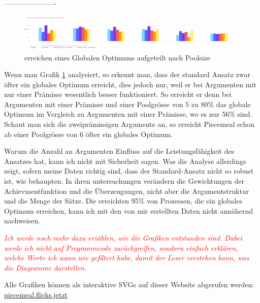 \documentclass{article}
\begin{document}
----------------------


\begin{figure}[ht]
  \centering
  \includegraphics[width=\textwidth]{erreichen eines Globalen Optimums aufgeteilt nach Poolsize}
  \caption{erreichen eines Globalen Optimums aufgeteilt nach Poolsize\label{fig:GlobOptPoolsize}}
\end{figure}

Wenn man Grafik \ref{fig:GlobOptPoolsize} analysiert, so erkennt man, dass der standard Ansatz zwar öfter ein globales Optimum erreicht, dies jedoch nur, weil er bei Argumenten mit nur einer Prämisse wesentlich besser funktioniert. So erreicht er denn bei Argumenten mit einer Prämisse und einer Poolgrösse von 5 zu 80\% das globale Optimum im Vergleich zu Argumenten mit einer Prämisse, wo es nur 56\% sind. Schaut man sich die zweiprämissigen Argumente an, so erreicht Piecemeal schon ab einer Poolgrösse von 6 öfter ein globales Optimum.

Warum die Anzahl an Argumenten Einfluss auf die Leistungsfähigkeit des Ansatzes hat, kann ich nicht mit Sicherheit sagen. Was die Analyse allerdings zeigt, sofern meine Daten richtig sind, dass der Standard-Ansatz nicht so robust ist, wie \autocite[S.~17-18]{beisbart_making_2015} behaupten. In ihren untersuchungen verändern \citeauthor{beisbart_making_2015} die Gewichtungen der Achievmentfunktion und die Überzeugungen, nicht aber die Argumentstruktur und die Menge der Sätze. Die erreichten 95\% von Prozessen, die ein globales Optimum erreichen, kann ich mit den von mir erstellten Daten nicht annähernd nachweisen.

\textit{\textcolor{red}{Ich werde noch mehr dazu erzählen, wie die Grafiken entstanden sind. Dabei werde ich nicht auf Programmcode zurückgreifen, sondern einfach erklären, welche Werte ich wann wie gefiltert habe, damit der Leser verstehen kann, was die Diagramme darstellen.}}

Alle Grafiken können als interaktive SVGs auf dieser Website abgerufen werden: \href{https://piecemeal.flicks.jetzt/}{piecemeal.flicks.jetzt}
\end{document}
